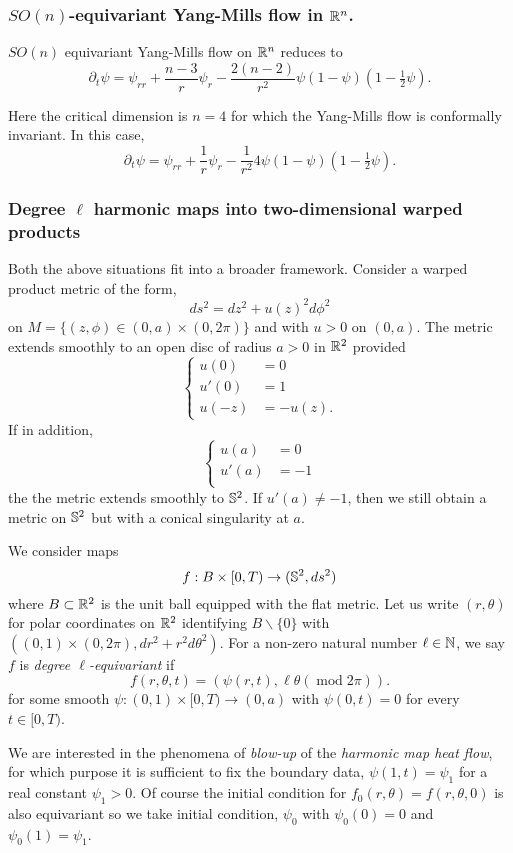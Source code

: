 \documentclass{amsart}
\begin{document}
\subsubsection*{\(SO(n)\)-equivariant Yang-Mills flow in \(\R^n\).}

\(SO(n)\) equivariant Yang-Mills flow on \(\R^n\) reduces to
\[
\partial_t \psi = \psi_{rr} + \frac{n-3}{r} \psi_r - \frac{2(n-2)}{r^2} \psi(1 - \psi)(1 - \tfrac{1}{2} \psi).
\]

Here the critical dimension is \(n=4\) for which the Yang-Mills flow is conformally invariant. In this case,
\[
\partial_t \psi = \psi_{rr} + \frac{1}{r} \psi_r - \frac{1}{r^2} 4 \psi(1 - \psi)(1 - \tfrac{1}{2} \psi).
\]

\subsubsection*{Degree \(\ell\) harmonic maps into two-dimensional warped products}

Both the above situations fit into a broader framework. Consider a warped product metric of the form,
\[
ds^2 = dz^2 + u(z)^2 d\phi^2
\]
on $M = \{(z,\phi) \in (0, a) \times (0, 2\pi)\}$ and with \(u > 0\) on \((0, a)\). The metric extends smoothly to an open disc of radius $a > 0$ in $\R^2$ provided
\[
\begin{cases}
u(0) &= 0 \\
u'(0) &= 1 \\
u(-z) &= - u(z).
\end{cases}
\]
If in addition,
\[
\begin{cases}
u(a) &= 0 \\
u'(a) &= -1 \\
\end{cases}
\]
the the metric extends smoothly to $\S^2$. If $u'(a) \ne -1$, then we still obtain a metric on $\S^2$ but with a conical singularity at $a$.

We consider maps
\[
f : B \times [0, T) \to (\S^2, ds^2)
\]
where $B \subset \R^2$ is the unit ball equipped with the flat metric. Let us write $(r, \theta)$ for polar coordinates on $\R^2$ identifying $B \backslash \{0\}$ with $((0, 1) \times (0, 2\pi), dr^2 + r^2 d\theta^2)$. For a non-zero natural number \(\ell \in \N\), we say $f$ is \emph{degree $\ell$-equivariant} if
\[
f (r, \theta, t) = (\psi(r, t), \ell\theta (\operatorname{mod} 2\pi)).
\]
for some smooth $\psi : (0, 1) \times [0, T) \to (0, a)$ with \(\psi(0, t) = 0\) for every \(t \in [0, T)\).

We are interested in the phenomena of \emph{blow-up} of the \emph{harmonic map heat flow}, for which purpose it is sufficient to fix the boundary data, \(\psi(1, t) = \psi_1\) for a real constant \(\psi_1 > 0\). Of course the initial condition for \(f_0(r, \theta) = f(r, \theta, 0)\) is also equivariant so we take initial condition, \(\psi_0\) with \(\psi_0(0) = 0\) and \(\psi_0(1) = \psi_1\).
\end{document}
